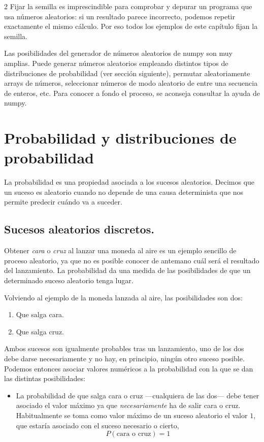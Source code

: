 \begin{paracol}{2}
Fijar la semilla es imprescindible para comprobar y depurar un programa que usa números aleatorios: si un resultado parece incorrecto, podemos repetir exactamente el mismo cálculo. Por eso todos los ejemplos de este capítulo fijan la semilla.

Las posibilidades del generador de números aleatorios de numpy son muy amplias. Puede generar números aleatorios empleando distintos tipos de distribuciones de probabilidad (ver sección siguiente), permutar aleatoriamente arrays de números, seleccionar números de modo aleatorio de entre una secuencia de enteros, etc. Para conocer a fondo el proceso, se aconseja consultar la ayuda de numpy.

\section{Probabilidad y distribuciones de probabilidad}
La probabilidad es una propiedad asociada a los sucesos aleatorios. Decimos que un suceso es aleatorio cuando no depende de una causa determinista que nos permite predecir cuándo va a suceder. 

\subsection{Sucesos aleatorios discretos.}
Obtener \emph{cara} o \emph{cruz} al lanzar una moneda al aire es un ejemplo sencillo de proceso aleatorio, ya que no es posible conocer de antemano cuál será el resultado del lanzamiento. La probabilidad da una medida de las posibilidades de que un determinado suceso aleatorio tenga lugar.

Volviendo al ejemplo de la moneda  lanzada al aire, las posibilidades son dos:
\begin{enumerate}
\item Que salga cara.
\item Que salga cruz.
\end{enumerate}
Ambos sucesos son igualmente probables tras un lanzamiento, uno de los dos debe darse necesariamente y no hay, en principio, ningún otro suceso posible. Podemos entonces asociar valores numéricos a la probabilidad con la que se dan las distintas posibilidades:
\begin{itemize}
\item La probabilidad de que salga cara o cruz ---cualquiera de las dos--- debe tener asociado el valor máximo ya que \emph{necesariamente} ha de salir cara o cruz.  Habitualmente se toma como valor máximo de un suceso aleatorio el valor $1$, que estaría asociado con el suceso necesario o cierto,
\begin{equation*}
P(\text{cara o cruz}) = 1
\end{equation*}


\end{itemize}
\end{paracol}
